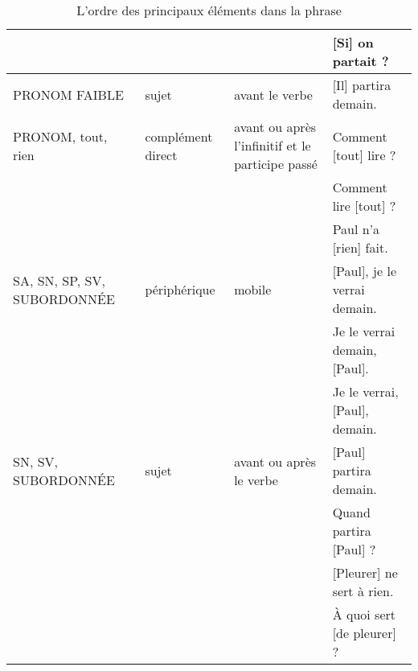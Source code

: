 \documentclass[UTF8]{report}
\begin{document}
\begin{table}[H]
\begin{adjustbox}{max width=\textwidth}
\begin{tabular}{|p{3.5cm}|p{3.5cm}|p{3.5cm}|p{5cm}|}
        & & & [Si] on partait ? \\
        \hline
        PRONOM FAIBLE & sujet & avant le verbe & [Il] partira demain. \\
        \hline
        PRONOM, tout, rien & complément direct & avant ou après l'infinitif et le participe passé & Comment [tout] lire ? \\
        & & & Comment lire [tout] ? \\
        & & & Paul n'a [rien] fait. \\
        \hline
        SA, SN, SP, SV, SUBORDONNÉE & périphérique & mobile & [Paul], je le verrai demain. \\
        & & & Je le verrai demain, [Paul]. \\
        & & & Je le verrai, [Paul], demain. \\
        \hline
        SN, SV, SUBORDONNÉE & sujet & avant ou après le verbe & [Paul] partira demain. \\
        & & & Quand partira [Paul] ? \\
        & & & [Pleurer] ne sert à rien. \\
        & & & À quoi sert [de pleurer] ? \\
        \hline
        \end{tabular}
    \end{adjustbox}
    \caption{L’ordre des principaux éléments dans la phrase}
\end{table}
\end{document}
